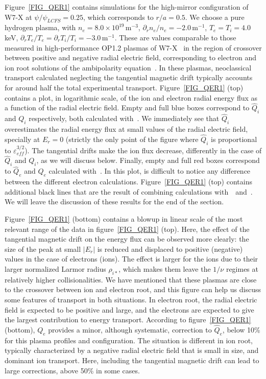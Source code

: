 Figure~\ref{FIG_QER1} contains simulations for the high-mirror configuration of W7-X at $\psi/\psi_{LCFS}=0.25$, which corresponds to $r/a=0.5$. We choose a pure hydrogen plasma, with $n_e=8.0\times 10^{19}\,$m$^{-3}$, $\partial_r n_e/n_e=-2.0\,$m$^{-1}$, $T_e = T_i = 4.0\,$keV, $\partial_r T_e/T_e =\partial_r T_i/T_i = -3.0\,$m$^{-1}$. These are values comparable to those measured in high-performance OP1.2 plasmas of W7-X~\citep{klinger2019op12} in the region of crossover between positive and negative radial electric field, corresponding to electron and ion root solutions of the ambipolarity equation~\citep{pablant2019ionroot}. In these plasmas, neoclassical transport calculated neglecting the tangential magnetic drift typically accounts for around half the total experimental transport. Figure~\ref{FIG_QER1} (top) contains a plot, in logarithmic scale, of the ion and electron radial energy flux as a function of the radial electric field. Empty and full blue boxes correspond to $\hat Q_i$ and $Q_i$ respectively, both calculated with~\KNOSOS. We immediately see that $\hat Q_i$ overestimates the radial energy flux at small values of the radial electric field, specially at $E_r = 0$ (strictly the only point of the figure where $\hat Q_i$ is proportional to $\varepsilon_{eff}^{3/2}$). The tangential drifts make the ion flux decrease, differently in the case of $\hat Q_i$ and $Q_i$, as we will discuss below. Finally, empty and full red boxes correspond to $\hat Q_e$ and $Q_e$ calculated with~\KNOSOS. In this plot, is difficult to notice any difference between the different electron calculations. Figure~\ref{FIG_QER1} (top) contains additional black lines that are the result of combining calculations with~\DKES~and~\KNOSOS. We will leave the discussion of these results for the end of the section.

Figure~\ref{FIG_QER1} (bottom) contains a blowup in linear scale of the most relevant range of the data in figure~\ref{FIG_QER1} (top). Here, the effect of the tangential magnetic drift on the energy flux can be observed more clearly: the size of the peak at small $|E_r|$ is reduced and displaced to positive (negative) values in the case of electrons (ions). The effect is larger for the ions due to their larger normalized Larmor radius $\rho_{i*}$, which makes them leave the $1/\nu$ regimes at relatively higher collisionalities. We have mentioned that these plasmas are close to the crossover between ion and electron root, and this figure can help us discuss some features of transport in both situations. In electron root, the radial electric field is expected to be positive and large, and the electrons are expected to give the largest contribution to energy transport. According to figure~\ref{FIG_QER1} (bottom), $Q_e$ provides a minor, although systematic, correction to $\hat Q_e$, below 10\% for this plasma profiles and configuration. The situation is different in ion root, typically characterized by a negative radial electric field that is small in size, and dominant ion transport. Here, including the tangential magnetic drift can lead to large corrections, above 50\% in some cases.

